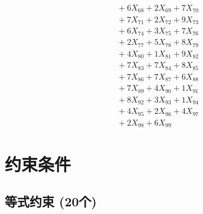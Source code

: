 \documentclass[a4paper,10pt]{article}
\begin{document}
{\begin{align}
&\;  + 6 X_{68} + 2 X_{69} + 7 X_{70} \\[0.3ex]
&\;  + 7 X_{71} + 2 X_{72} + 9 X_{73} \\[0.3ex]
&\;  + 6 X_{74} + 3 X_{75} + 7 X_{76} \\[0.3ex]
&\;  + 2 X_{77} + 5 X_{78} + 8 X_{79} \\[0.5ex]\allowbreak
&\;  + 4 X_{80} + 1 X_{81} + 9 X_{82} \\[0.3ex]
&\;  + 7 X_{83} + 7 X_{84} + 8 X_{85} \\[0.3ex]
&\;  + 7 X_{86} + 7 X_{87} + 6 X_{88} \\[0.3ex]
&\;  + 7 X_{89} + 4 X_{90} + 1 X_{91} \\[0.3ex]
&\;  + 8 X_{92} + 3 X_{93} + 1 X_{94} \\[0.3ex]
&\;  + 4 X_{95} + 2 X_{96} + 4 X_{97} \\[0.3ex]
&\;  + 2 X_{98} + 6 X_{99}\nonumber
\end{align}
}

\section{约束条件}

\subsection{等式约束 (20个)}
\end{document}
